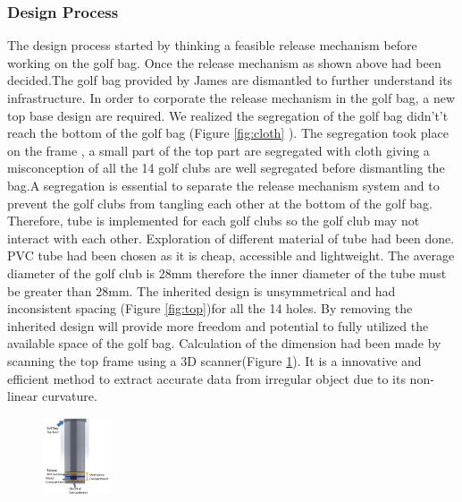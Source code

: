 \documentclass[11pt,landscape]{article}
\begin{document}
\begin{multicols}{3}
    \subsubsection*{Design Process}
    The design process started by thinking a feasible release mechanism before
    working on the golf bag. Once the release mechanism as shown above had been
    decided.The golf bag provided by James are dismantled to further understand
    its infrastructure. In order to corporate the release mechanism in the golf
    bag, a new top base design are required. We realized the segregation of the
    golf bag didn't’t reach the bottom of the golf bag (Figure \ref{fig:cloth}
    ). The segregation took place on the frame , a small part of the top part
    are segregated with cloth giving a misconception of all the 14 golf clubs
    are well segregated before dismantling the bag.A segregation is essential to
    separate the release mechanism system and to prevent the golf clubs from
    tangling each other at the bottom of the golf bag. Therefore, tube is
    implemented for each golf clubs so the golf club may not interact with each
    other. Exploration of different material of tube had been done. PVC tube had
    been chosen as it is cheap, accessible and lightweight. The average diameter
    of the golf club is 28mm therefore the inner diameter of the tube must be
    greater than 28mm. The inherited design is unsymmetrical and had
    inconsistent spacing (Figure \ref{fig:top})for all the 14 holes. By removing
    the inherited design will provide more freedom and potential to fully
    utilized the available space of the golf bag. Calculation of the dimension
    had been made by scanning the top frame using a 3D scanner(Figure
    \ref{fig:scan}). It is a innovative and efficient method to extract accurate
    data from irregular object due to its non-linear curvature.
    \begin{figure}[H]
        \begin{center}
            \includegraphics[width=0.18\textwidth]{Figure15.jpg}
            \label{fig:scan}
        \end{center}
    \end{figure}
    

\end{multicols}
\end{document}
